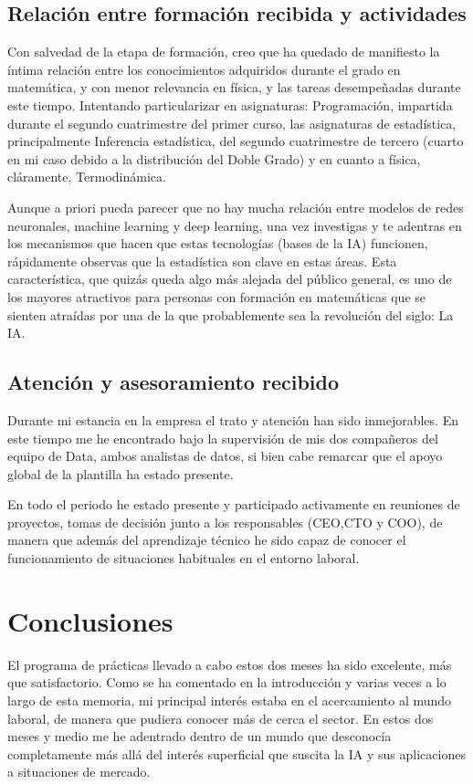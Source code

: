 \section{Relación entre formación recibida y actividades}
\label{Relacion entre formacion recibida y actividades}
%
%
Con salvedad de la etapa de formación, creo que ha quedado de manifiesto la íntima relación entre los conocimientos adquiridos durante el grado en matemática, y con menor relevancia en física, y las tareas desempeñadas durante este tiempo. Intentando particularizar en asignaturas: Programación, impartida durante el segundo cuatrimestre del primer curso, las asignaturas de estadística, principalmente Inferencia estadística, del segundo cuatrimestre de tercero (cuarto en mi caso debido a la distribución del Doble Grado) y en cuanto a física, cláramente, Termodinámica.

Aunque a priori pueda parecer que no hay mucha relación entre modelos de redes neuronales, machine learning y deep learning, una vez investigas y te adentras en los mecanismos que hacen que estas tecnologías (bases de la IA) funcionen, rápidamente observas que la estadística son clave en estas áreas. Esta característica, que quizás queda algo más alejada del público general, es uno de los mayores atractivos para personas con formación en matemáticas que se sienten atraídas por una de la que probablemente sea la revolución del siglo: La IA.
%
%
\section{Atención y asesoramiento recibido} \label{Atencion y asesoramiento recibido}
%
%
Durante mi estancia en la empresa el trato y atención han sido inmejorables. En este tiempo me he encontrado bajo la supervisión de mis dos compañeros del equipo de Data, ambos analistas de datos, si bien cabe remarcar que el apoyo global de la plantilla ha estado presente.

En todo el periodo he estado presente y participado activamente en reuniones de proyectos, tomas de decisión junto a los responsables (CEO,CTO y COO), de manera que además del aprendizaje técnico he sido capaz de conocer el funcionamiento de situaciones habituales en el entorno laboral.
%
%
\chapter{Conclusiones}
%
%
El programa de prácticas llevado a cabo estos dos meses ha sido excelente, más que satisfactorio. Como se ha comentado en la introducción y varias veces a lo largo de esta memoria, mi principal interés estaba en el acercamiento al mundo laboral, de manera que pudiera conocer más de cerca el sector. En estos dos meses y medio me he adentrado dentro de un mundo que desconocía completamente más allá del interés superficial que suscita la IA y sus aplicaciones a situaciones de mercado.

